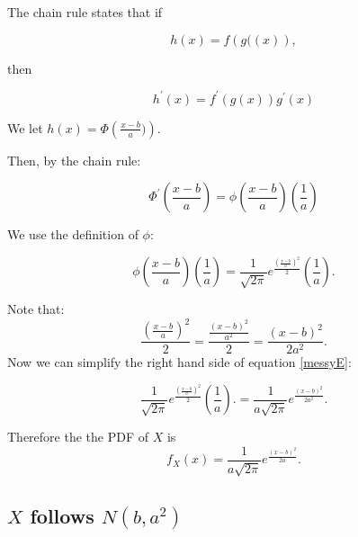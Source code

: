 \documentclass[a4paper,11pt]{article}
\begin{document}
The chain rule states that if

\begin{equation}
	h\left( x \right) =
		f\left( g ( \left( x \right) \right),
\end{equation}

then

\begin{equation}
	h^{\prime}\left(x \right)
		= f^{\prime}\left( g \left( x \right)\right) g^{\prime} \left( x \right)
\end{equation}


We let $h \left( x \right) = \Phi \left( \frac{x-b}{a}) \right)$.

Then, by the chain rule:

\begin{equation}
	\Phi^{\prime} \left( \frac{x-b}{a} \right) =
		\phi \left( \frac{x-b}{a} \right) \left(\frac{1}{a} \right)
\end{equation}

We use the definition of $\phi$:

\begin{equation} \label{messyE}
		\phi \left( \frac{x-b}{a} \right) \left(\frac{1}{a} \right) =
	\frac{1}{\sqrt{2 \pi }} e^{\frac{ \left( \frac{ x-b }{a} \right)^{2}}{2}} \left(\frac{1}{a} \right).
\end{equation}

Note that:
\begin{equation}
\frac{ \left( \frac{ x-b }{a} \right)^{2}}{2} =
	\frac { \frac{ \left( x - b \right)^{2}} {a^2}}{2}
	= \frac{ \left( x -b \right)^2}{2a^2}.
\end{equation}
Now we can simplify the right hand side of equation \ref{messyE}:

\begin{equation}
	\frac{1}{\sqrt{2 \pi }} e^{\frac{ \left( \frac{ x-b }{a} \right)^{2}}{2}} \left(\frac{1}{a} \right).
	= \frac{1}{a \sqrt{2 \pi }} e^{\frac{ \left( x-b \right)^{2}}{2a^2}}.
\end{equation}

Therefore the the PDF of $X$ is
\begin{equation} \label{pdfX}
 f_{X} \left( x \right)
	= \frac{1}{a \sqrt{2 \pi }} e^{\frac{ \left( x-b \right)^{2}}{2a}}.
\end{equation}

\subsection{$X$ follows $N \left( b, a^{2} \right)$} \label{prob5c}
\end{document}
